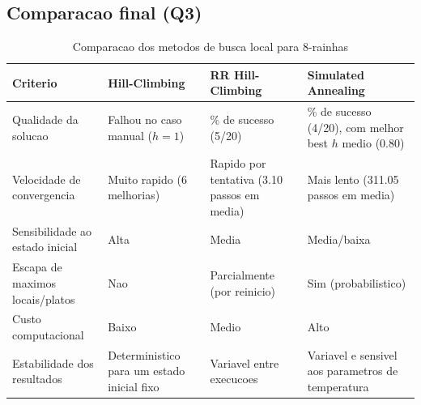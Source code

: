 \subsection{Comparacao final (Q3)}
\begingroup
\footnotesize
\begin{table}[H]
\centering
\setlength{\tabcolsep}{3pt}
\renewcommand{\arraystretch}{1.15}
\begin{tabular}{>{\raggedright\arraybackslash}p{3.8cm} >{\raggedright\arraybackslash}p{3.2cm} >{\raggedright\arraybackslash}p{3.2cm} >{\raggedright\arraybackslash}p{3.2cm}}
\toprule
Criterio & Hill-Climbing & RR Hill-Climbing & Simulated Annealing \\
\midrule
Qualidade da solucao & Falhou no caso manual ($h=1$) & 25\% de sucesso (5/20) & 20\% de sucesso (4/20), com melhor best $h$ medio (0.80) \\
Velocidade de convergencia & Muito rapido (6 melhorias) & Rapido por tentativa (3.10 passos em media) & Mais lento (311.05 passos em media) \\
Sensibilidade ao estado inicial & Alta & Media & Media/baixa \\
Escapa de maximos locais/platos & Nao & Parcialmente (por reinicio) & Sim (probabilistico) \\
Custo computacional & Baixo & Medio & Alto \\
Estabilidade dos resultados & Deterministico para um estado inicial fixo & Variavel entre execucoes & Variavel e sensivel aos parametros de temperatura \\
\bottomrule
\end{tabular}
\caption{Comparacao dos metodos de busca local para 8-rainhas}
\end{table}
\endgroup
